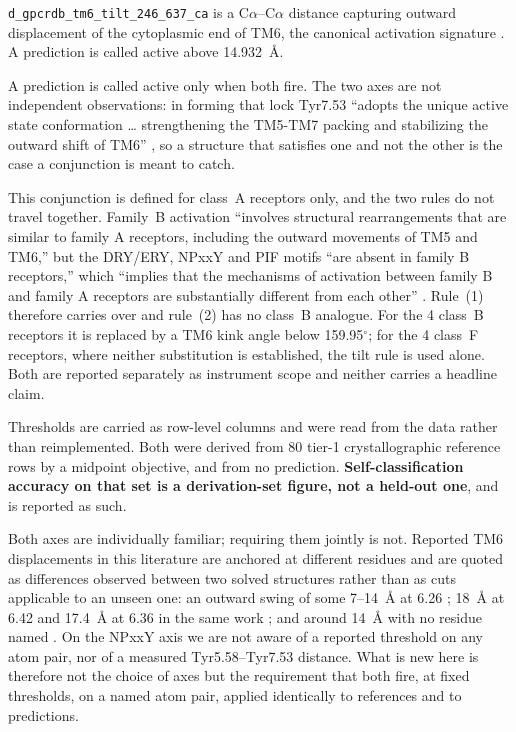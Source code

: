 \texttt{d\_gpcrdb\_tm6\_tilt\_246\_637\_ca} is a C$\alpha$--C$\alpha$ distance
capturing outward displacement of the cytoplasmic end of TM6, the canonical
activation signature \citep{hilger2020gcgr}. A prediction is called active above 14.932~\AA.

A prediction is called active only when both fire. The two axes are not
independent observations: in forming that lock Tyr7.53 ``adopts the unique
active state conformation \ldots{} strengthening the TM5-TM7 packing and
stabilizing the outward shift of TM6''
\citep[p.~3693]{georgiou2025heterogeneity}, so a structure that satisfies one
and not the other is the case a conjunction is meant to catch.

This conjunction is defined for class~A receptors only, and the two rules do
not travel together. Family~B activation ``involves structural rearrangements
that are similar to family A receptors, including the outward movements of TM5
and TM6,'' but the DRY/ERY, NPxxY and PIF motifs ``are absent in family B
receptors,'' which ``implies that the mechanisms of activation between family B
and family A receptors are substantially different from each other''
\citep[p.~6]{hilger2020gcgr}. Rule~(1) therefore carries over and rule~(2) has
no class~B analogue. For the 4 class~B receptors it is replaced by a TM6 kink
angle below
159.95$^\circ$; for the 4 class~F receptors, where neither substitution is
established, the tilt rule is used alone. Both are reported separately as
instrument scope and neither carries a headline claim.

Thresholds are carried as
row-level columns and were read from the data rather than reimplemented. Both
were derived from 80 tier-1 crystallographic reference rows by a midpoint
objective, and from no prediction. \textbf{Self-classification accuracy on that
set is a derivation-set figure, not a held-out one}, and is reported as such.

Both axes are individually familiar; requiring them jointly is not. Reported TM6
displacements in this literature are anchored at different residues and are
quoted as differences observed between two solved structures rather than as cuts
applicable to an unseen one: an outward swing of some 7--14~\AA{} at 6.26
\citep[p.~3714]{georgiou2025heterogeneity}; 18~\AA{} at 6.42 and 17.4~\AA{} at
6.36 in the same work \citep[pp.~3,~5]{hilger2020gcgr}; and around 14~\AA{} with
no residue named \citep[p.~13]{ye2026multistatebias}. On the NPxxY axis we are not aware of
a reported threshold on any atom pair, nor of a measured Tyr5.58--Tyr7.53
distance. What is new here is therefore not the choice of axes but the
requirement that both fire, at fixed thresholds, on a named atom pair, applied
identically to references and to predictions.

